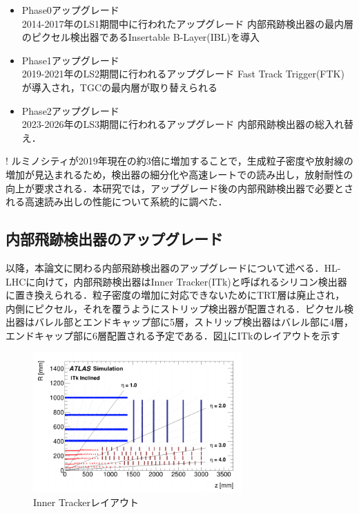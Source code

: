\begin{itemize}
\item Phase0アップグレード\\
2014-2017年のLS1期間中に行われたアップグレード
内部飛跡検出器の最内層のピクセル検出器であるInsertable B-Layer(IBL)を導入
\item Phase1アップグレード\\
2019-2021年のLS2期間に行われるアップグレード
Fast Track Trigger(FTK)が導入され，TGCの最内層が取り替えられる
\item Phase2アップグレード\\
2023-2026年のLS3期間に行われるアップグレード
内部飛跡検出器の総入れ替え．
\end{itemize}
!
ルミノシティが2019年現在の約3倍に増加することで，生成粒子密度や放射線の増加が見込まれるため，検出器の細分化や高速レートでの読み出し，放射耐性の向上が要求される．本研究では，アップグレード後の内部飛跡検出器で必要とされる高速読み出しの性能について系統的に調べた．


\subsection{内部飛跡検出器のアップグレード}
以降，本論文に関わる内部飛跡検出器のアップグレードについて述べる．HL-LHCに向けて，内部飛跡検出器はInner Tracker(ITk)と呼ばれるシリコン検出器に置き換えられる．粒子密度の増加に対応できないためにTRT層は廃止され，内側にピクセル，それを覆うようにストリップ検出器が配置される．ピクセル検出器はバレル部とエンドキャップ部に5層，ストリップ検出器はバレル部に4層，エンドキャップ部に6層配置される予定である．図\ref{fig:ITkview}にITkのレイアウトを示す\par

\begin{figure}[h]
  \centering
  \includegraphics[width=8cm]{./figure/ITkview.png}
  \caption{Inner Trackerレイアウト\cite{Collaboration:2285585}}
  \label{fig:ITkview}
\end{figure}


